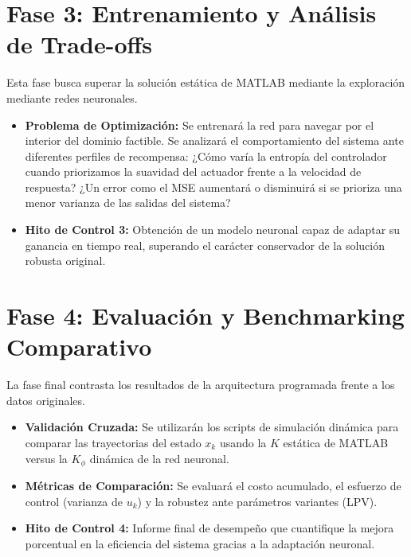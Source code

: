 \documentclass[12pt,twoside]{report}
\begin{document}
\section{Fase 3: Entrenamiento y Análisis de Trade-offs}

Esta fase busca superar la solución estática de MATLAB mediante la exploración mediante redes neuronales.

\begin{itemize}
    \item \textbf{Problema de Optimización:} Se entrenará la red para navegar por el interior del dominio factible. Se analizará el comportamiento del sistema ante diferentes perfiles de recompensa: ¿Cómo varía la entropía del controlador cuando priorizamos la suavidad del actuador frente a la velocidad de respuesta? ¿Un error como el MSE aumentará o disminuirá si se prioriza una menor varianza de las salidas del sistema?
    \item \textbf{Hito de Control 3:} Obtención de un modelo neuronal capaz de adaptar su ganancia en tiempo real, superando el carácter conservador de la solución robusta original.
\end{itemize}

\section{Fase 4: Evaluación y Benchmarking Comparativo}

La fase final contrasta los resultados de la arquitectura programada frente a los datos originales.

\begin{itemize}
    \item \textbf{Validación Cruzada:} Se utilizarán los scripts de simulación dinámica  para comparar las trayectorias del estado $x_k$ usando la $K$ estática de MATLAB versus la $K_{\phi}$ dinámica de la red neuronal.
    \item \textbf{Métricas de Comparación:} Se evaluará el costo acumulado, el esfuerzo de control (varianza de $u_k$) y la robustez ante parámetros variantes (LPV).
    \item \textbf{Hito de Control 4:} Informe final de desempeño que cuantifique la mejora porcentual en la eficiencia del sistema gracias a la adaptación neuronal.
\end{itemize}
\end{document}

